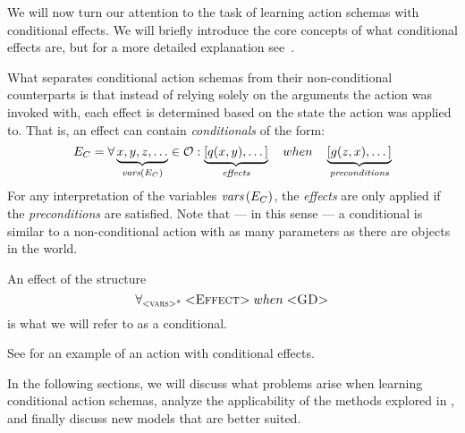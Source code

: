 \documentclass[../Master.tex]{subfiles}
\begin{document}
We will now turn our attention to the task of learning action schemas with conditional effects. 
We will briefly introduce the core concepts of what conditional effects are, but for a more detailed explanation see~. 

What separates conditional action schemas from their non-conditional counterparts is that instead of relying solely on the arguments the action was invoked with, each effect is determined based on the state the action was applied to. That is, an effect can contain \emph{conditionals} of the form:
\begin{equation*}
    E_C = \forall \underbrace{x, y, z, \dots}_{\textit{vars} \left(E_C\right)}\in \mathcal{O} : 
    \underbrace{\left[ q(x, y), \dots \right]}_{\textit{effects}} \quad when \quad 
    \underbrace{\left[ g(z, x), \dots  \right]}_{\textit{preconditions}}
\end{equation*}
For any interpretation of the variables $\textit{vars}\left(E_C\right)$, the \textit{effects} are only applied if the \textit{preconditions} are satisfied. Note that --- in this sense --- a conditional is similar to a non-conditional action with as many parameters as there are objects in the world. 

\begin{definition}[Conditional]
	An effect of the structure 
	\begin{equation}
		\forall_{\textsc{<vars>*}} \; \textsc{<Effect>} \; when \; \textsc{<GD>}
	\end{equation} is what we will refer to as a conditional.
\end{definition}


See  for an example of an action with conditional effects. 

In the following sections, we will discuss what problems arise when learning conditional action schemas, analyze the applicability of the methods explored in , and finally discuss new models that are better suited.
\end{document}

